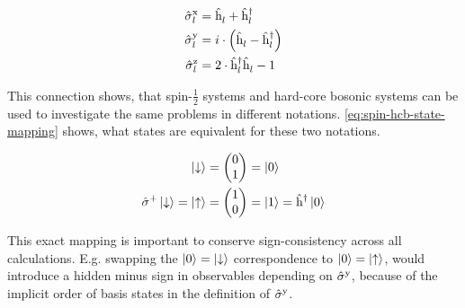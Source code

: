\begin{equation}
    \label{eq:jordan-wigner-spin-hcb}
    \begin{split}
        \pauli[l]{x} &= \hop{l}{} + \hop{l}{\dagger} \\
        \pauli[l]{y} &= i \cdot \left(\hop{l}{} - \hop{l}{\dagger}\right) \\
        \pauli[l]{z} &= 2 \cdot \hop{l}{\dagger}\hop{l}{} -1
    \end{split}
\end{equation}

This connection shows, that spin-$\frac{1}{2}$ systems and hard-core bosonic systems can be used to investigate the same problems in different notations.
\autoref{eq:spin-hcb-state-mapping} shows, what states are equivalent for these two notations.

\begin{equation}
    \label{eq:spin-hcb-state-mapping}
    \begin{split}
        \ketN[\down] &= \left(\begin{matrix}
            0 \\
            1
        \end{matrix}\right) = \ketN[0] \\
        \pauli[]{+}\ketN[\down] = \ketN[\up] &= \left(\begin{matrix}
            1 \\
            0
        \end{matrix}\right) = \ketN[1] = \hop{}{\dagger}\ketN[0] \\
    \end{split}
\end{equation}

This exact mapping is important to conserve sign-consistency across all calculations. 
E.g. swapping the $\ketN[0] = \ketN[\down]$ correspondence to $\ketN[0] = \ketN[\up]$, would introduce a hidden minus sign in observables depending on $\pauli[]{y}$, because of the implicit order of basis states in the definition of $\pauli[]{y}$.